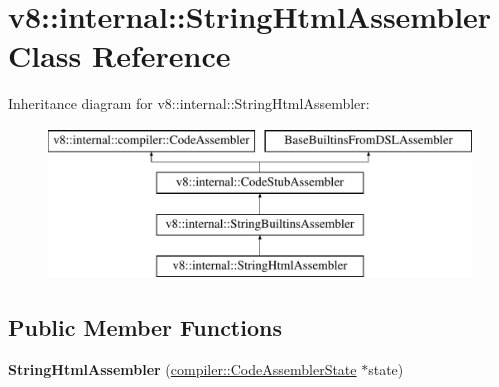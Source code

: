\hypertarget{classv8_1_1internal_1_1StringHtmlAssembler}{}\section{v8\+:\+:internal\+:\+:String\+Html\+Assembler Class Reference}
\label{classv8_1_1internal_1_1StringHtmlAssembler}
Inheritance diagram for v8\+:\+:internal\+:\+:String\+Html\+Assembler\+:\begin{figure}[H]
\begin{center}
\leavevmode
\includegraphics[height=4.000000cm]{classv8_1_1internal_1_1StringHtmlAssembler}
\end{center}
\end{figure}
\subsection*{Public Member Functions}
\begin{DoxyCompactItemize}
\item 
\mbox{\label{classv8_1_1internal_1_1StringHtmlAssembler_a9cb9a26dad0cc1202e813392dac37d7b}} 
{\bfseries String\+Html\+Assembler} (\mbox{\hyperlink{classv8_1_1internal_1_1compiler_1_1CodeAssemblerState}{compiler\+::\+Code\+Assembler\+State}} $\ast$state)
\end{DoxyCompactItemize}

